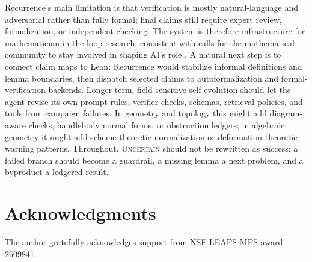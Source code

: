 \documentclass{article}
\theoremstyle{definition}
\theoremstyle{remark}
\begin{document}
Recurrence's main limitation is that verification is mostly natural-language and adversarial rather than fully formal; final claims still require expert review, formalization, or independent checking. The system is therefore infrastructure for mathematician-in-the-loop research, consistent with calls for the mathematical community to stay involved in shaping AI's role \citep{ghosal2026futuremath}. A natural next step is to connect claim maps to Lean: Recurrence would stabilize informal definitions and lemma boundaries, then dispatch selected claims to autoformalization and formal-verification backends. Longer term, field-sensitive self-evolution should let the agent revise its own prompt rules, verifier checks, schemas, retrieval policies, and tools from campaign failures. In geometry and topology this might add diagram-aware checks, handlebody normal forms, or obstruction ledgers; in algebraic geometry it might add scheme-theoretic normalization or deformation-theoretic warning patterns. Throughout, \textsc{Uncertain} should not be rewritten as success: a failed branch should become a guardrail, a missing lemma a next problem, and a byproduct a ledgered result.

\section*{Acknowledgments}

The author gratefully acknowledges support from NSF LEAPS-MPS award 2609841.



\end{document}
